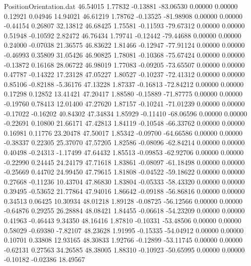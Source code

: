 \begin{filecontents}{PositionOrientation.dat}
  46.54015    1.77832   -0.13881   -83.06530    0.00000    0.00000    0.12921    0.04946   14.94021
  46.61219    1.78762   -0.13525   -81.98908    0.00000    0.00000   -0.44154    0.26807   32.13812
  46.68425    1.75581   -0.11593   -79.67312    0.00000    0.00000    0.51948   -0.10592    2.82472
  46.76434    1.79741   -0.12442   -79.44688    0.00000    0.00000    0.24000   -0.07038   21.36575
  46.83622    1.81466   -0.12947   -77.91124    0.00000    0.00000   -0.46993    0.35809   31.05426
  46.90825    1.78081   -0.10368   -75.67424    0.00000    0.00000   -0.13872    0.16168   28.06722
  46.98019    1.77083   -0.09205   -73.65507    0.00000    0.00000    0.47787   -0.14322   17.23128
  47.05227    1.80527   -0.10237   -72.41312    0.00000    0.00000    0.85106   -0.82188   -5.36176
  47.13228    1.87337   -0.16813   -72.84212    0.00000    0.00000    0.17298    0.12852   13.41421
  47.20417    1.88580   -0.15889   -71.87775    0.00000    0.00000   -0.19760    0.78413   12.01400
  47.27620    1.87157   -0.10241   -71.01239    0.00000    0.00000   -0.17022   -0.16202   40.84302
  47.34834    1.85929   -0.11410   -68.06596    0.00000    0.00000   -0.22691    0.10800   21.66171
  47.42813    1.84119   -0.10548   -66.33762    0.00000    0.00000    0.16981    0.11776   23.20478
  47.50017    1.85342   -0.09700   -64.66586    0.00000    0.00000   -0.38337    0.22305   25.37070
  47.57205    1.82586   -0.08096   -62.84214    0.00000    0.00000    0.40498   -0.24313   -1.17499
  47.64432    1.85513   -0.09853   -62.92706    0.00000    0.00000   -0.22990    0.24445   24.24179
  47.71618    1.83861   -0.08097   -61.18498    0.00000    0.00000   -0.25669    0.44702   24.99450
  47.79615    1.81808   -0.04522   -59.18622    0.00000    0.00000    0.27668   -0.11236   10.43704
  47.86830    1.83804   -0.05333   -58.43320    0.00000    0.00000    0.39495   -0.53652   21.77864
  47.94016    1.86642   -0.09188   -56.86816    0.00000    0.00000    0.34513    0.06425   10.30934
  48.01218    1.89128   -0.08725   -56.12566    0.00000    0.00000   -0.64876    0.29255   26.28884
  48.08421    1.84455   -0.06618   -54.23209    0.00000    0.00000    0.41963   -0.46443    9.34350
  48.16416    1.87810   -0.10331   -53.48506    0.00000    0.00000    0.58029   -0.69380   -7.82107
  48.23628    1.91995   -0.15335   -54.04912    0.00000    0.00000    0.10701    0.33808   12.93165
  48.30833    1.92766   -0.12899   -53.11745    0.00000    0.00000   -0.62131    0.27563   34.26585
  48.38005    1.88310   -0.10923   -50.65995    0.00000    0.00000   -0.10182   -0.02386   18.49567

\end{filecontents}
